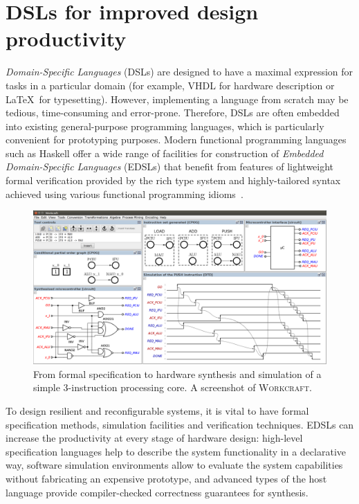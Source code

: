 \documentclass[conference]{IEEEtran}
\begin{document}
\section{DSLs for improved design productivity\label{sec:dsl}}

\emph{Domain-Specific Languages} (DSLs) are designed to have a maximal expression for
tasks in a particular domain (for example, VHDL for hardware description or
\LaTeX~for typesetting). However, implementing a language from scratch may be tedious,
time-consuming and error-prone. Therefore, DSLs are often embedded into existing general-purpose programming languages, which is particularly convenient for
prototyping purposes.
Modern functional programming languages such as Haskell offer a
wide range of facilities for construction of \emph{Embedded Domain-Specific Languages}
(EDSLs) that benefit from features of lightweight formal verification provided by
the rich type system and highly-tailored syntax achieved using various functional
programming idioms~\cite{HudakDSLs}.

\begin{figure}[ht!]
\begin{center}
    \includegraphics[width=0.96\linewidth]{FIG/screen.png}
    \vspace{-3.5mm}
    \caption{From formal specification to hardware synthesis and
    simulation of a simple 3-instruction processing core. A screenshot of \textsc{Workcraft}.}
    \label{fig:screenshot}
\end{center}
\vspace{-7.5mm}
\end{figure}

To design resilient and reconfigurable systems, it is vital to have formal
specification methods, simulation facilities and verification techniques.
EDSLs can increase the productivity at every stage of hardware design:
high-level specification
languages help to describe the system functionality in a declarative way, software
simulation environments allow to evaluate the system capabilities
without fabricating an expensive prototype, and advanced types of the host language
provide compiler-checked correctness guarantees for synthesis.
\end{document}
